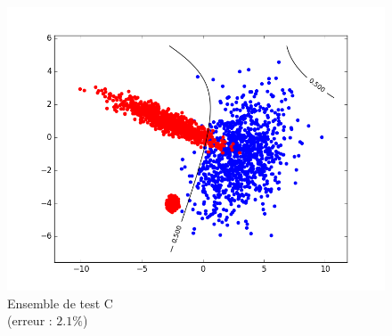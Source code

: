 \documentclass[paper=a4, fontsize=11pt]{article}
\begin{document}
\begin{figure}[h]
 \begin{minipage}[b]{.3\linewidth}
  \begin{center}
  \includegraphics[scale=0.25]{figures/QDA_C_test.png}
  \caption*{Ensemble de test C  \\ (erreur : $2.1\%$)}
   \end{center}
 \end{minipage}
\end{figure}
\end{document}
